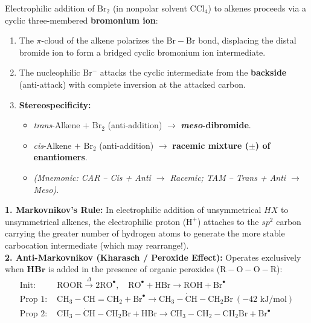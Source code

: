 \documentclass[10pt,twoside,openright]{book}
\begin{document}
\begin{conceptbox}
Electrophilic addition of $\mathrm{Br_2}$ (in nonpolar solvent $\mathrm{CCl_4}$) to alkenes proceeds via a cyclic three-membered \textbf{bromonium ion}:
\begin{enumerate}[leftmargin=*]
  \item The $\pi$-cloud of the alkene polarizes the $\mathrm{Br-Br}$ bond, displacing the distal bromide ion to form a bridged cyclic bromonium ion intermediate.
  \item The nucleophilic $\mathrm{Br^-}$ attacks the cyclic intermediate from the \textbf{backside} (anti-attack) with complete inversion at the attacked carbon.
  \item \textbf{Stereospecificity:}
  \begin{itemize}
    \item \textit{trans}-Alkene $+$ $\mathrm{Br_2}$ (anti-addition) $\longrightarrow$ \textbf{\textit{meso}-dibromide}.
    \item \textit{cis}-Alkene $+$ $\mathrm{Br_2}$ (anti-addition) $\longrightarrow$ \textbf{racemic mixture ($\pm$) of enantiomers}.
    \item \textit{(Mnemonic: CAR -- Cis + Anti $\to$ Racemic; TAM -- Trans + Anti $\to$ Meso)}.
  \end{itemize}
\end{enumerate}
\end{conceptbox}

\begin{formulabox}
\textbf{1. Markovnikov's Rule:} In electrophilic addition of unsymmetrical $HX$ to unsymmetrical alkenes, the electrophilic proton ($\mathrm{H^+}$) attaches to the $sp^2$ carbon carrying the greater number of hydrogen atoms to generate the more stable carbocation intermediate (which may rearrange!).\\
\textbf{2. Anti-Markovnikov (Kharasch / Peroxide Effect):}
Operates exclusively when $\mathbf{HBr}$ is added in the presence of organic peroxides ($\mathrm{R-O-O-R}$):
\begin{align}
  \text{Init: } & \mathrm{ROOR} \xrightarrow{\Delta} 2\mathrm{RO}^\bullet, \quad \mathrm{RO}^\bullet + \mathrm{HBr} \to \mathrm{ROH} + \mathrm{Br}^\bullet\\
  \text{Prop 1: } & \mathrm{CH_3-CH=CH_2} + \mathrm{Br}^\bullet \to \mathrm{CH_3-\dot{C}H-CH_2Br} \ (-42\text{ kJ/mol})\\
  \text{Prop 2: } & \mathrm{CH_3-\dot{C}H-CH_2Br} + \mathrm{HBr} \to \mathrm{CH_3-CH_2-CH_2Br} + \mathrm{Br}^\bullet
\end{align}
\end{formulabox}
\end{document}
